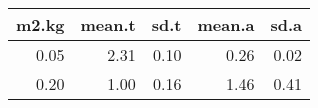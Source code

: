 \begin{table}[ht]
\centering
\begin{tabular}{rrrrr}
  \hline
m2.kg & mean.t & sd.t & mean.a & sd.a \\ 
  \hline
0.05 & 2.31 & 0.10 & 0.26 & 0.02 \\ 
  0.20 & 1.00 & 0.16 & 1.46 & 0.41 \\ 
   \hline
\end{tabular}
\end{table}

